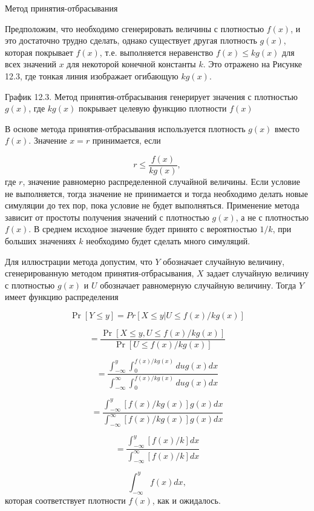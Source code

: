 \begin{center}
Метод принятия-отбрасывания
\end{center}

Предположим, что необходимо сгенерировать величины с плотностью $f(x)$, и это достаточно трудно сделать, однако существует другая плотность $g(x)$, которая покрывает $f(x)$, т.е. выполняется неравенство $f(x)\leq kg(x)$ для всех значений $x$ для некоторой конечной константы $k$. Это отражено на Рисунке 12.3, где тонкая линия изображает огибающую $kg(x)$.

\vspace{2cm}



График 12.3. Метод принятия-отбрасывания генерирует значения с плотностью $g(x)$, где $kg(x)$ покрывает целевую функцию плотности $f(x)$

В основе метода принятия-отбрасывания используется плотность $g(x)$ вместо $f(x)$. Значение $x=r$ принимается, если

\[
r\leq \dfrac{f(x)}{kg(x)},
\]
где $r$, значение равномерно распределенной случайной величины. Если условие не выполняется, тогда значение не принимается и тогда необходимо делать новые симуляции до тех пор, пока условие не будет выполняться. Применение метода зависит от простоты получения значений с плотностью $g(x)$, а не с плотностью $f(x)$. В среднем исходное  значение будет принято с вероятностью $1/k$, при больших значениях $k$ необходимо будет сделать много симуляций. 

Для иллюстрации метода допустим, что $Y$ обозначает случайную величину, сгенерированную методом принятия-отбрасывания, $X$ задает случайную величину с плотностью $g(x)$ и $U$ обозначает равномерную случайную величину. Тогда $Y$ имеет функцию распределения

\[
\Pr[Y\leq y]=Pr[X\leq y|U\leq f(x)/kg(x)]
\]

\[
=\dfrac{\Pr[X\leq y, U\leq f(x)/kg(x)]}{\Pr[U\leq f(x)/kg(x)]}
\]

\[
=\dfrac{\int^{y}_{-\infty}\int^{f(x)/kg(x)}_{0}dug(x)dx}{\int^{\infty}_{-\infty}\int^{f(x)/kg(x)}_{0}dug(x)dx}
\]

\[
=\dfrac{\int^{y}_{-\infty}[f(x)/kg(x)]g(x)dx}{\int^{\infty}_{-\infty}[f(x)/kg(x)]g(x)dx}
\]

\[
=\dfrac{\int^{y}_{-\infty}[f(x)/k]dx}{\int^{\infty}_{-\infty}[f(x)/k]dx}
\]

\[
\int^{y}_{-\infty}f(x)dx,
\]
которая соответствует плотности $f(x)$, как и ожидалось.

